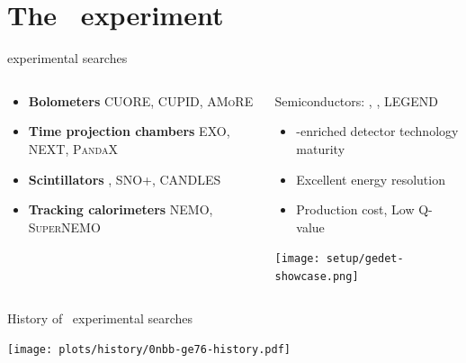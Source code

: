 \documentclass[10pt,aspectratio=169]{beamer}
\newcommand{\cmark}{\textcolor{mLightGreen}{\ding{51}}}
\newcommand{\xmark}{\textcolor{mLightBrown}{\ding{55}}}
\begin{document}
\section{The \gerda\ experiment}
\begin{frame}{\texorpdfstring{\onbb}{0nbb} experimental searches}
  \begin{columns}
    \begin{column}{0.5\textwidth}
      \begin{itemize}
        \item \textbf{Bolometers} CUORE, CUPID, \textsc{AMoRE}
        \item \textbf{Time projection chambers} EXO, NEXT, \textsc{PandaX}
        \item \textbf{Scintillators} \kamlandzen, SNO+, CANDLES
        \item \textbf{Tracking calorimeters} NEMO, \textsc{SuperNEMO}
      \end{itemize}
    \end{column}
    \begin{column}{0.5\textwidth}
      \begin{alertblock}{Semiconductors: \gerda, \majoranademo, LEGEND}
        \begin{itemize}\small
          \item[\cmark] \gesix-enriched detector technology maturity
          \item[\cmark] Excellent energy resolution
          \item[\xmark] Production cost, Low Q-value
        \end{itemize}
      \end{alertblock}
      \begin{center}
        \texttt{[image: setup/gedet-showcase.png]}
      \end{center}
    \end{column}
  \end{columns}
\end{frame}
\begin{frame}{History of \gesix\ experimental \texorpdfstring{\onbb}{0nbb} searches}
  \begin{center}
    \texttt{[image: plots/history/0nbb-ge76-history.pdf]}
  \end{center}
\end{frame}
\end{document}

